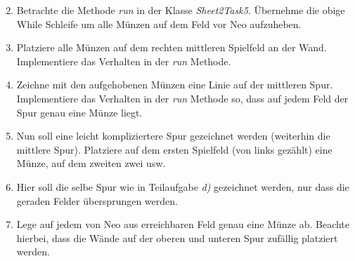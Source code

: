 \begin{enumerate}[label=\alph*)] \setcounter{enumi}{1}
    \item Betrachte die Methode \textit{run} in der Klasse \textit{Sheet2Task5}. Übernehme die obige While Schleife um 
    alle Münzen auf dem Feld vor Neo aufzuheben.
    \item Platziere alle Münzen auf dem rechten mittleren Spielfeld an der Wand. Implementiere das Verhalten in der \textit{run} Methode.
    \item Zeichne mit den aufgehobenen Münzen eine Linie auf der mittleren Spur. Implementiere das Verhalten in der \textit{run} Methode so, dass 
    auf jedem Feld der Spur genau eine Münze liegt.
    \item Nun soll eine leicht kompliziertere Spur gezeichnet werden (weiterhin die mittlere Spur). Platziere auf dem ersten Spielfeld (von links gezählt)
    eine Münze, auf dem zweiten zwei usw.
    \item Hier soll die selbe Spur wie in Teilaufgabe \textit{d)} gezeichnet werden, nur dass die geraden Felder übersprungen werden.
    \item Lege auf jedem von Neo aus erreichbaren Feld genau eine Münze ab. Beachte hierbei, dass die Wände auf der oberen und unteren Spur zufällig platziert 
    werden.
\end{enumerate}
